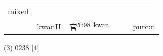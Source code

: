 \documentclass[14pt,a4paper]{scrartcl}
\begin{document}
\begin{longtable}[c]{@{}llllll@{}}
\begin{minipage}[t]{0.14\columnwidth}\raggedright\strut
mixed
\strut\end{minipage}\tabularnewline
\begin{minipage}[t]{0.14\columnwidth}\raggedright\strut
𡧺
\strut\end{minipage} &
\begin{minipage}[t]{0.14\columnwidth}\raggedright\strut
kwanH
\strut\end{minipage} &
\begin{minipage}[t]{0.14\columnwidth}\raggedright\strut
官\textsuperscript{5b98~kwan}
\strut\end{minipage} &
\begin{minipage}[t]{0.14\columnwidth}\raggedright\strut
\strut\end{minipage} &
\begin{minipage}[t]{0.14\columnwidth}\raggedright\strut
\strut\end{minipage} &
\begin{minipage}[t]{0.14\columnwidth}\raggedright\strut
pure:n
\strut\end{minipage}\tabularnewline
\bottomrule
\end{longtable}

(3) 0238 {[}4{]}
\end{document}
